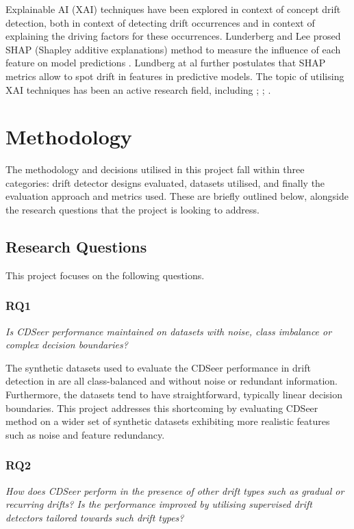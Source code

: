 \documentclass{svproc}
\begin{document}
Explainable AI (XAI) techniques have been explored in context of concept drift detection, both in context of detecting drift occurrences and in context of explaining the driving factors for these occurrences. Lunderberg and Lee prosed SHAP (Shapley additive explanations) method to measure the influence of each feature on model predictions \cite{lundberg2017}. Lundberg at al \cite{lundberg2020} further postulates that SHAP metrics allow to spot drift in features in predictive models. The topic of utilising XAI techniques has been an active research field, including \cite{haug2022}; \cite{lee2023}; \cite{tripathi2025}.


\section{Methodology}

The methodology and decisions utilised in this project fall within three categories: drift detector designs evaluated, datasets utilised, and finally the evaluation approach and metrics used. These are briefly outlined below, alongside the research questions that the project is looking to address.

\subsection{Research Questions}
This project focuses on the following questions.

\subsubsection{RQ1}\textit{Is CDSeer performance maintained on datasets with noise, class imbalance or complex decision boundaries?}

The synthetic datasets used to evaluate the CDSeer performance in drift detection in \cite{pham2025} are all class-balanced and without noise or redundant information. Furthermore, the datasets tend to have straightforward, typically linear decision boundaries. This project addresses this shortcoming by evaluating CDSeer method on a wider set of synthetic datasets exhibiting more realistic features such as noise and feature redundancy.

\subsubsection{RQ2}\textit{How does CDSeer perform in the presence of other drift types such as gradual or recurring drifts? Is the performance improved by utilising supervised drift detectors tailored towards such drift types?}
\end{document}
